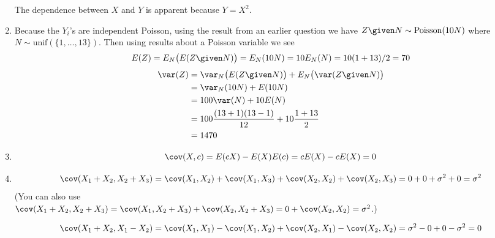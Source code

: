 \documentclass[12pt]{article}
\begin{document}
\begin{enumerate}
The dependence between $X$ and $Y$ is apparent because $Y = X^2$.

\item
Because the $Y_i$'s are independent Poisson,
using the result from an earlier question we have
$Z\given N \sim \text{Poisson}(10N)$ where $N\sim \text{unif}(\{1,\dotsc,13\})$.
Then using results about a Poisson variable we see
\[
E(Z)
= E_{N}\bigl(E(Z\given N)\bigr) = E_N(10N)
= 10 E_{N}(N)
= 10 (1+13)/2
= 70
\]
\[\begin{split}
\var(Z)
&= \var_N\bigl(E(Z\given N)\bigr) + E_N\bigl(\var(Z\given N)\bigr)
\\
&= \var_N(10N) + E(10N)
\\
&= 100\var(N) + 10E(N)
\\
&= 100\frac{(13+1)(13-1)}{12} + 10\frac{1+13}{2}
\\
&= 1470
\end{split}
\]

\item
\[
\cov(X, c)
= E(cX) - E(X)E(c)
= cE(X) - cE(X)
= 0
\]

\item
\[
\cov(X_1+X_2, X_2+X_3)
= \cov(X_1, X_2) + \cov(X_1, X_3) + \cov(X_2, X_2) + \cov(X_2, X_3)
= 0 + 0 + \sigma^2 + 0 = \sigma^2
\]
(You can also use\\
$\cov(X_1+X_2, X_2+X_3)
= \cov(X_1, X_2+X_3) + \cov(X_2, X_2+X_3)
= 0 + \cov(X_2,X_2)
= \sigma^2$.)

\[
\cov(X_1+X_2, X_1-X_2)
= \cov(X_1,X_1) - \cov(X_1,X_2) + \cov(X_2,X_1) - \cov(X_2,X_2)
= \sigma^2 - 0 + 0 - \sigma^2
= 0
\]
\end{enumerate}
\end{document}
